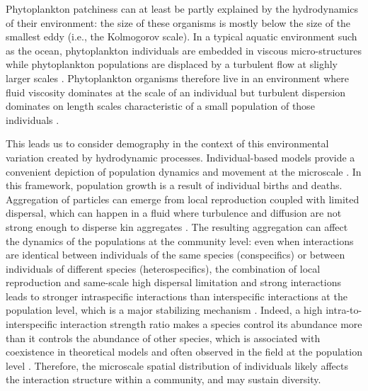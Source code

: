 \documentclass[english]{article}
\begin{document}
Phytoplankton patchiness can at least be partly explained by the hydrodynamics
of their environment: the size of these organisms is mostly below
the size of the smallest eddy (i.e., the Kolmogorov scale). In a typical
aquatic environment such as the ocean, phytoplankton individuals are
embedded in viscous micro-structures \citep{peters_effects_2000}
while phytoplankton populations are displaced by a turbulent flow
at slighly larger scales \citep{martin_phytoplankton_2003,prairie_biophysical_2012}.
Phytoplankton organisms therefore live in an environment where fluid
viscosity dominates at the scale of an individual but turbulent dispersion
dominates on length scales characteristic of a small population of
those individuals \citep{estrada_effects_1987,prairie_biophysical_2012}. 

This leads us to consider demography in the context of this environmental
variation created by hydrodynamic processes. Individual-based models
provide a convenient depiction of population dynamics and movement
at the microscale \citep{hellweger_bunch_2009}. In this framework,
population growth is a result of individual births and deaths. Aggregation
of particles can emerge from local reproduction coupled with limited
dispersal, which can happen in a fluid where turbulence and diffusion
are not strong enough to disperse kin aggregates \citep{young_reproductive_2001}.
The resulting aggregation can affect the dynamics of the populations
at the community level: even when interactions are identical between
individuals of the same species (conspecifics) or between individuals
of different species (heterospecifics), the combination of local reproduction
and same-scale high dispersal limitation and strong interactions leads
to stronger intraspecific interactions than interspecific interactions
at the population level, which is a major stabilizing mechanism \citep{detto_stabilization_2016}.
Indeed, a high intra-to-interspecific interaction strength ratio makes
a species control its abundance more than it controls the abundance
of other species, which is associated with coexistence in theoretical
models \citep{levine_importance_2009,barabas_self-regulation_2017}
and often observed in the field at the population level \citep{adler_competition_2018,picoche_strong_2020}.
Therefore, the microscale spatial distribution of individuals likely
affects the interaction structure within a community, and may sustain
diversity.
\end{document}
